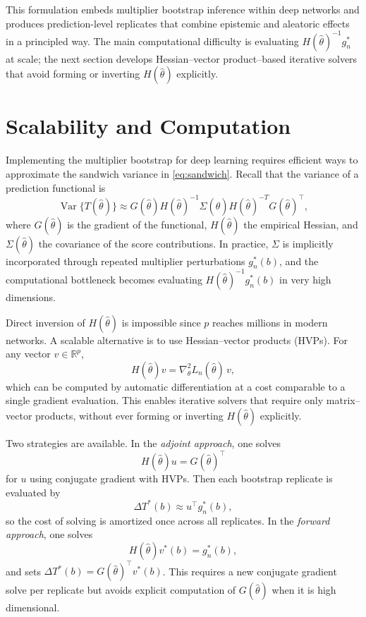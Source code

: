 \documentclass[12pt, titlepage, reqno]{article}
\begin{document}
This formulation embeds multiplier bootstrap inference within deep
networks and produces prediction-level replicates that combine epistemic
and aleatoric effects in a principled way. The main computational
difficulty is evaluating $H(\hat{\theta})^{-1}g_n^*$ at scale; the next
section develops Hessian–vector product–based iterative solvers that
avoid forming or inverting $H(\hat{\theta})$ explicitly.


\section{Scalability and Computation}

Implementing the multiplier bootstrap for deep learning requires
efficient ways to approximate the sandwich variance in
\eqref{eq:sandwich}. Recall that the variance of a prediction functional
is
\[
\operatorname{Var}\{T(\hat{\theta})\}\approx
G(\hat{\theta})H(\hat{\theta})^{-1}\Sigma(\hat{\theta})
H(\hat{\theta})^{-T}G(\hat{\theta})^\top,
\]
where $G(\hat{\theta})$ is the gradient of the functional,
$H(\hat{\theta})$ the empirical Hessian, and $\Sigma(\hat{\theta})$ the
covariance of the score contributions. In practice, $\Sigma$ is
implicitly incorporated through repeated multiplier perturbations
$g_n^*(b)$, and the computational bottleneck becomes evaluating
$H(\hat{\theta})^{-1} g_n^*(b)$ in very high dimensions.


Direct inversion of $H(\hat{\theta})$ is impossible since $p$ reaches
millions in modern networks. A scalable alternative is to use
Hessian–vector products (HVPs). For any vector $v \in \mathbb{R}^p$,
\[
H(\hat{\theta})v = \nabla_\theta^2 L_n(\hat{\theta})\,v,
\]
which can be computed by automatic differentiation at a cost comparable
to a single gradient evaluation. This enables iterative solvers that
require only matrix–vector products, without ever forming or inverting
$H(\hat{\theta})$ explicitly.


Two strategies are available. In the \emph{adjoint approach}, one solves
\[
H(\hat{\theta})u = G(\hat{\theta})^\top
\]
for $u$ using conjugate gradient with HVPs. Then each bootstrap replicate
is evaluated by
\[
\Delta T^*(b) \approx u^\top g_n^*(b),
\]
so the cost of solving is amortized once across all replicates. In the
\emph{forward approach}, one solves
\[
H(\hat{\theta})v^*(b) = g_n^*(b),
\]
and sets $\Delta T^*(b)=G(\hat{\theta})^\top v^*(b)$. This requires a
new conjugate gradient solve per replicate but avoids explicit
computation of $G(\hat{\theta})$ when it is high dimensional.
\end{document}
